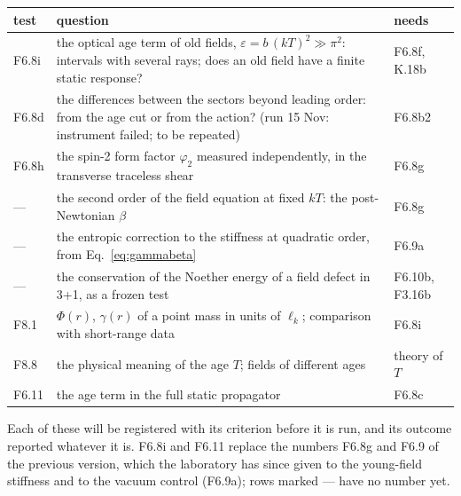 \begin{center}
\begin{tabularx}{\linewidth}{>{\raggedright\arraybackslash}p{1.3cm}>{\raggedright\arraybackslash}X>{\raggedright\arraybackslash}p{3.0cm}}
\toprule
test & question & needs\\
\midrule
F6.8i & the optical age term of old fields, $\varepsilon=b\,(kT)^2\gg\pi^2$: intervals with several rays; does
  an old field have a finite static response? & F6.8f, K.18b\\
F6.8d & the differences between the sectors beyond leading order: from the age cut or from the action? (run
  15 Nov: instrument failed; to be repeated) & F6.8b2\\
F6.8h & the spin-2 form factor $\varphi_2$ measured independently, in the transverse traceless shear & F6.8g\\
--- & the second order of the field equation at fixed $kT$: the post-Newtonian $\beta$ & F6.8g\\
--- & the entropic correction to the stiffness at quadratic order, from Eq.~\eqref{eq:gammabeta} & F6.9a\\
--- & the conservation of the Noether energy of a field defect in 3+1, as a frozen test & F6.10b, F3.16b\\
F8.1 & $\Phi(r)$, $\gamma(r)$ of a point mass in units of $\ell_k$; comparison with short-range data & F6.8i\\
F8.8 & the physical meaning of the age $T$; fields of different ages & theory of $T$\\
F6.11 & the age term in the full static propagator & F6.8c\\
\bottomrule
\end{tabularx}
\end{center}
Each of these will be registered with its criterion before it is run, and its outcome reported whatever it
is. F6.8i and F6.11 replace the numbers F6.8g and F6.9 of the previous version, which the laboratory has since
given to the young-field stiffness and to the vacuum control (F6.9a); rows marked --- have no number yet.
